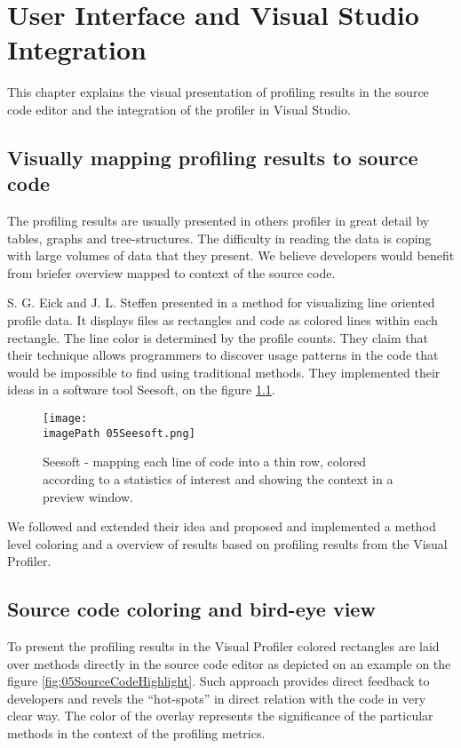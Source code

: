 \chapter{User Interface and Visual Studio Integration }
\label{chap:VPUIandSI}


This chapter explains the visual presentation of profiling results in the source code editor and the integration of the profiler in Visual Studio.

\section{Visually mapping profiling results to source code}
The profiling results are usually presented in others profiler in great detail by tables, graphs and tree-structures. The difficulty in reading the data is coping with large volumes of data that they present. We believe developers would benefit from briefer overview mapped to context of the source code.

S. G. Eick and J. L. Steffen presented in \cite{EickSteffen92} a method for visualizing line oriented profile data. It displays files as rectangles and code as colored lines within each rectangle. The line color is determined by the profile counts. They claim that their technique allows programmers to discover usage patterns in the code that would be impossible to find using traditional methods. They implemented their ideas in a software tool Seesoft, on the figure \ref{fig:05SeeSoft}.

\begin{figure}
	\centering
		\texttt{[image: \\imagePath 05Seesoft.png]}
		\caption{Seesoft - mapping each line of code into a thin row, colored according to a statistics of interest and showing the context in a preview window.}
	\label{fig:05SeeSoft}
\end{figure}


We followed and extended their idea and proposed and implemented a method level coloring and a overview of results based on profiling results from the Visual Profiler. 

\section{Source code coloring and bird-eye view}
To present the profiling results in the Visual Profiler colored rectangles are laid over methods directly in the source code editor as depicted on an example on the figure \ref{fig:05SourceCodeHighlight}. Such approach provides direct feedback to developers and revels the ``hot-spots'' in direct relation with the code in very clear way.  The color of the overlay represents the significance of the particular methods in the context of the profiling metrics.

